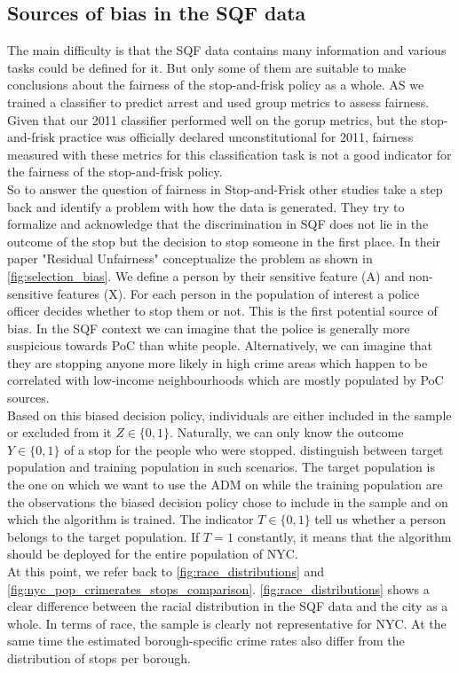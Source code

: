 
\subsection{Sources of bias in the SQF data}
The main difficulty is that the SQF data contains many information and various tasks could be defined for it. But only some of them are suitable to make conclusions about the fairness of the stop-and-frisk policy as a whole. AS \cite{Badr2022DTFANSP} we trained a classifier to predict arrest and used group metrics to assess fairness. Given that our 2011 classifier performed well on the gorup metrics, but the stop-and-frisk practice was officially declared unconstitutional for 2011, fairness measured with these metrics for this classification task is not a good indicator for the fairness of the stop-and-frisk policy.\\
So to answer the question of fairness in Stop-and-Frisk other studies take a step back and identify a problem with how the data is generated. They try to formalize and acknowledge that the discrimination in SQF does not lie in the outcome of the stop but the decision to stop someone in the first place. In their paper "Residual Unfairness" \cite{kallus2018} conceptualize the problem as shown in \autoref{fig:selection_bias}.
We define a person by their sensitive feature (A) and non-sensitive features (X). For each person in the population of interest a police officer decides whether to stop them or not. This is the first potential source of bias. In the SQF context we can imagine that the police is generally more suspicious towards PoC than white people. Alternatively, we can imagine that they are stopping anyone more likely in high crime areas which happen to be correlated with low-income neighbourhoods which are mostly populated by PoC {\color{red}sources}. \\
Based on this biased decision policy, individuals are either included in the sample or excluded from it $Z \in \{0,1\}$.  Naturally, we can only know the outcome $Y \in \{0, 1\}$ of a stop for the people who were stopped.
\cite{kallus2018} distinguish between target population and training population in such scenarios. The target population is the one on which we want to use the ADM on while the training population are the observations the biased decision policy chose to include in the sample and on which the algorithm is trained. The indicator $T \in \{0, 1\}$ tell us whether a person belongs to the target population. If $T = 1$ constantly, it means that the algorithm should be deployed for the entire population of NYC.\\
At this point, we refer back to \autoref{fig:race_distributions} and \autoref{fig:nyc_pop_crimerates_stops_comparison}. \autoref{fig:race_distributions} shows a clear difference between the racial distribution in the SQF data and the city as a whole. In terms of race, the sample is clearly not representative for NYC. At the same time the estimated borough-specific crime rates also differ from the distribution of stops per borough. \\

